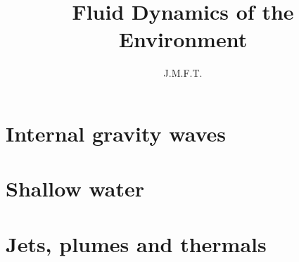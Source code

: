 \documentclass{article}
\title{Fluid Dynamics of the Environment}
\author{J.M.F.T.}
\begin{document}
\maketitle
\tableofcontents

\section{Internal gravity waves}



\newpage
\section{Shallow water}



\section{Jets, plumes and thermals}
\end{document}
